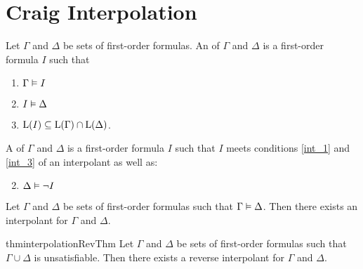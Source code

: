 


\section{Craig Interpolation}


\begin{defi}
	\label{def:interpolant}
	Let $\Gamma$ and $\Delta$ be sets of first-order formulas.
	An  of $\Gamma$ and $\Delta$ is a first-order formula $I$ such that 
	\begin{enumerate}
		\item $ \Gamma \vDash I$ \label{int_1}
		\item $ I \vDash \Delta $  \label{int_2}
		\item $ \operatorname{L}(I) \subseteq \operatorname{L}(\Gamma) \cap \operatorname{L}(\Delta)$.  \label{int_3}
	\end{enumerate}

	\begin{samepage}
		A  of $\Gamma$ and $\Delta$ is a first-order formula $I$ such that $I$ meets conditions \ref{int_1} and \ref{int_3} of an interpolant as well as:
		\begin{enumerate}[\quad\:1'.]
				\setcounter{enumi}{1}
			\item $ \Delta \vDash \lnot I $  \label{int_2prime}
				\qedhere
		\end{enumerate}
	\end{samepage}
\end{defi}

\begin{thm}[Interpolation]
	\label{thm:interpolation_original}
	Let $\Gamma$ and $\Delta$ be sets of first-order formulas such that $ \Gamma \vDash \Delta $.
	Then there exists an interpolant for $\Gamma$ and $\Delta$.
\end{thm}
%
\begin{restatable}{thm}{interpolationRevThm}
		\label{thm:interpolation}
		Let $\Gamma$ and $\Delta$ be sets of first-order formulas such that $ \Gamma \cup \Delta $ is unsatisfiable.
		Then there exists a reverse interpolant for $\Gamma$ and\nolinebreak{} $\Delta$.
\end{restatable}



